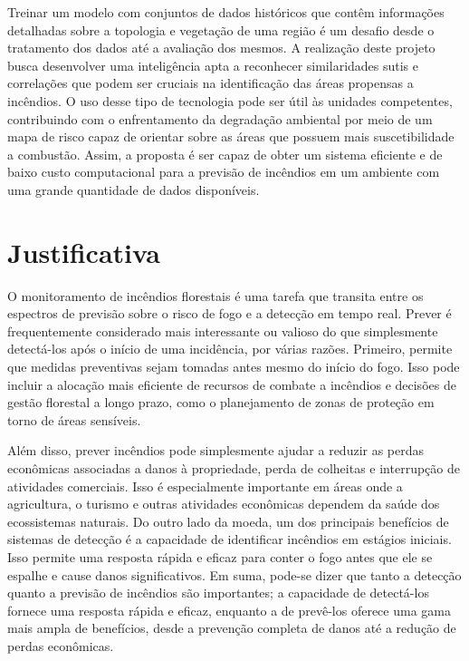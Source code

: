 \documentclass[tcc2]{uftex}
\begin{document}
Treinar um modelo com conjuntos de dados históricos que contêm informações detalhadas sobre a topologia e vegetação de uma região é um desafio desde o tratamento dos dados até a avaliação dos mesmos. A realização deste projeto busca desenvolver uma inteligência apta a reconhecer similaridades sutis e correlações que podem ser cruciais na identificação das áreas propensas a incêndios. O uso desse tipo de tecnologia pode ser útil às unidades competentes, contribuindo com o enfrentamento da degradação ambiental por meio de um mapa de risco capaz de orientar sobre as áreas que possuem mais suscetibilidade a combustão. Assim, a proposta é ser capaz de obter um sistema eficiente e de baixo custo computacional para a previsão de incêndios em um ambiente com uma grande quantidade de dados disponíveis.

\section{Justificativa}

O monitoramento de incêndios florestais é uma tarefa que transita entre os espectros de previsão sobre o risco de fogo e a detecção em tempo real. Prever é frequentemente considerado mais interessante ou valioso do que simplesmente detectá-los após o início de uma incidência, por várias razões. Primeiro, permite que medidas preventivas sejam tomadas antes mesmo do início do fogo. Isso pode incluir a alocação mais eficiente de recursos de combate a incêndios e decisões de gestão florestal a longo prazo, como o planejamento de zonas de proteção em torno de áreas sensíveis.

Além disso, prever incêndios pode simplesmente ajudar a reduzir as perdas econômicas associadas a danos à propriedade, perda de colheitas e interrupção de atividades comerciais. Isso é especialmente importante em áreas onde a agricultura, o turismo e outras atividades econômicas dependem da saúde dos ecossistemas naturais. Do outro lado da moeda, um dos principais benefícios de sistemas de detecção é a capacidade de identificar incêndios em estágios iniciais. Isso permite uma resposta rápida e eficaz para conter o fogo antes que ele se espalhe e cause danos significativos. Em suma, pode-se dizer que tanto a detecção quanto a previsão de incêndios são importantes; a capacidade de detectá-los fornece uma resposta rápida e eficaz, enquanto a de prevê-los oferece uma gama mais ampla de benefícios, desde a prevenção completa de danos até a redução de perdas econômicas.
\end{document}
